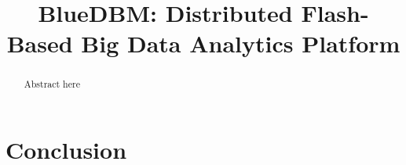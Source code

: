 \documentclass[pageno]{jpaper}
\begin{document}
\title{
BlueDBM: Distributed Flash-Based Big Data Analytics Platform}

\date{}
\maketitle


\begin{abstract}
Abstract here
\end{abstract}












\section{Conclusion}



\end{document}

